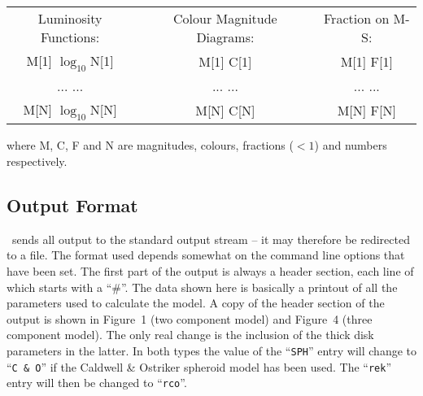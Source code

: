 \begin{table}[h]
\centering
\begin{tabular}{ccccc} \\
Luminosity Functions: & & Colour Magnitude Diagrams: & & Fraction on M-S: \\
M[1] \hspace{1cm} $\log_{10}$N[1] & \hspace{1cm} & M[1] \hspace{1cm} C[1] & \hspace{1cm} & M[1] \hspace{1cm} F[1] \\
... \hspace{1cm} ... & \hspace{1cm} & ... \hspace{1cm} ... & \hspace{1cm} & ... \hspace{1cm} ... \\
M[N] \hspace{1cm} $\log_{10}$N[N] & \hspace{1cm} & M[N] \hspace{1cm} C[N] & \hspace{1cm} & M[N] \hspace{1cm} F[N] 
\end{tabular}
\end{table}
\noindent where M, C, F and N are magnitudes, colours, fractions ($<1$) and 
numbers respectively.
 
\subsection{Output Format}

\egm\ sends all output to the standard output stream -- it may therefore
be redirected to a file. The format used depends somewhat on the command
line options that have been set. The first part of the output is always
a header section, each line of which starts with a ``\#''. The data shown
here is basically a printout of all the parameters used to calculate
the model. A copy of the header section of the output is shown in Figure~1 (two
component model) and Figure~4 (three component model). The only real change
is the inclusion of the thick disk parameters in the latter. In both types the
value of the ``{\tt SPH}'' entry will change to ``{\tt C \& O}'' if the 
Caldwell \& Ostriker spheroid model has been used. The ``{\tt rek}'' entry 
will then be changed to ``{\tt rco}''. 


